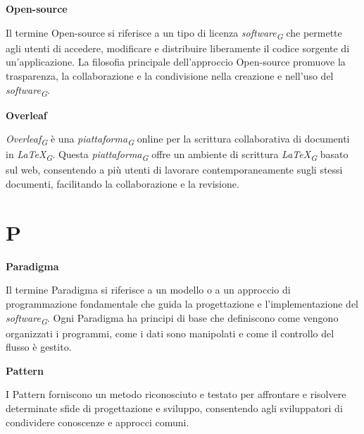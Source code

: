 \documentclass{article}
\begin{document}
\textbf{Open-source}

\vspace{0.1cm}

Il termine Open-source si riferisce a un tipo di licenza \textit{software}\textsubscript{\textit{G}} che permette agli utenti di accedere, modificare e distribuire liberamente il codice sorgente di un'applicazione. La filosofia principale dell'approccio Open-source promuove la trasparenza, la collaborazione e la condivisione nella creazione e nell'uso del \textit{software}\textsubscript{\textit{G}}.

\vspace{0.4cm}

\textbf{Overleaf}

\vspace{0.1cm}

\textit{Overleaf}\textsubscript{\textit{G}} è una \textit{piattaforma}\textsubscript{\textit{G}} online per la scrittura collaborativa di documenti in \textit{LaTeX}\textsubscript{\textit{G}}. Questa \textit{piattaforma}\textsubscript{\textit{G}} offre un ambiente di scrittura \textit{LaTeX}\textsubscript{\textit{G}} basato sul web, consentendo a più utenti di lavorare contemporaneamente sugli stessi documenti, facilitando la collaborazione e la revisione.

\pagebreak
\section*{P}
{}

\vspace{0.4cm}

\textbf{Paradigma}

\vspace{0.1cm}

Il termine Paradigma si riferisce a un modello o a un approccio di programmazione fondamentale che guida la progettazione e l'implementazione del \textit{software}\textsubscript{\textit{G}}. Ogni Paradigma ha principi di base che definiscono come vengono organizzati i programmi, come i dati sono manipolati e come il controllo del flusso è gestito.

\vspace{0.4cm}

\textbf{Pattern}

\vspace{0.1cm}

I Pattern forniscono un metodo riconosciuto e testato per affrontare e risolvere determinate sfide di progettazione e sviluppo, consentendo agli sviluppatori di condividere conoscenze e approcci comuni.
\end{document}
